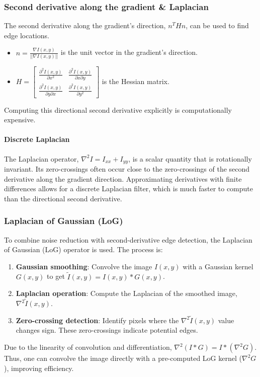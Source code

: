 \subsubsection{Second derivative along the gradient \& Laplacian}
The second derivative along the gradient's direction, $n^T H n$, can be used to find edge locations.
\begin{itemize}
  \item $n = \frac{\nabla I(x,y)}{||\nabla I(x,y)||}$ is the unit vector in the gradient's direction.
  \item $H =  \begin{bmatrix} \frac{\partial^2 I(x,y)}{\partial x^2} & \frac{\partial^2 I(x,y)}{\partial x \partial y} \\ \frac{\partial^2 I(x,y)}{\partial y \partial x} & \frac{\partial^2 I(x,y)}{\partial y^2} \end{bmatrix} $ is the Hessian matrix.
\end{itemize}
Computing this directional second derivative explicitly is computationally expensive.

\paragraph{Discrete Laplacian}
The Laplacian operator, $\nabla^2 I = I_{xx} + I_{yy}$, is a scalar quantity that is rotationally invariant. Its zero-crossings often occur close to the zero-crossings of the second derivative along the gradient direction. Approximating derivatives with finite differences allows for a discrete Laplacian filter, which is much faster to compute than the directional second derivative.

\subsubsection{Laplacian of Gaussian (LoG)}
To combine noise reduction with second-derivative edge detection, the Laplacian of Gaussian (LoG) operator is used. The process is:
\begin{enumerate}
  \item \textbf{Gaussian smoothing}: Convolve the image $I(x,y)$ with a Gaussian kernel $G(x,y)$ to get $\tilde{I}(x,y) = I(x,y) * G(x,y)$.
  \item \textbf{Laplacian operation}: Compute the Laplacian of the smoothed image, $\nabla^2 \tilde{I}(x,y)$.
  \item \textbf{Zero-crossing detection}: Identify pixels where the $\nabla^2 \tilde{I}(x,y)$ value changes sign. These zero-crossings indicate potential edges.
\end{enumerate}
Due to the linearity of convolution and differentiation, $\nabla^2 (I * G) = I * (\nabla^2 G)$. Thus, one can convolve the image directly with a pre-computed LoG kernel ($\nabla^2 G$), improving efficiency.

